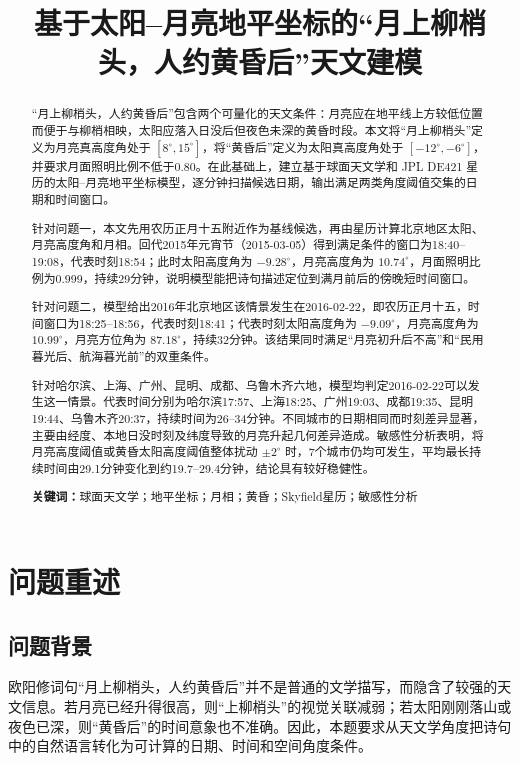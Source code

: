 \documentclass[UTF8,a4paper,12pt]{ctexart}
\title{\heiti 基于太阳--月亮地平坐标的“月上柳梢头，人约黄昏后”天文建模}
\author{}
\date{}
\begin{document}
\maketitle
\thispagestyle{empty}

\begin{abstract}
“月上柳梢头，人约黄昏后”包含两个可量化的天文条件：月亮应在地平线上方较低位置而便于与柳梢相映，太阳应落入日没后但夜色未深的黄昏时段。本文将“月上柳梢头”定义为月亮真高度角处于 $[8^\circ,15^\circ]$，将“黄昏后”定义为太阳真高度角处于 $[-12^\circ,-6^\circ]$，并要求月面照明比例不低于0.80。在此基础上，建立基于球面天文学和 JPL DE421 星历的太阳--月亮地平坐标模型，逐分钟扫描候选日期，输出满足两类角度阈值交集的日期和时间窗口。

针对问题一，本文先用农历正月十五附近作为基线候选，再由星历计算北京地区太阳、月亮高度角和月相。回代2015年元宵节（2015-03-05）得到满足条件的窗口为18:40--19:08，代表时刻18:54；此时太阳高度角为 $-9.28^\circ$，月亮高度角为 $10.74^\circ$，月面照明比例为0.999，持续29分钟，说明模型能把诗句描述定位到满月前后的傍晚短时间窗口。

针对问题二，模型给出2016年北京地区该情景发生在2016-02-22，即农历正月十五，时间窗口为18:25--18:56，代表时刻18:41；代表时刻太阳高度角为 $-9.09^\circ$，月亮高度角为 $10.99^\circ$，月亮方位角为 $87.18^\circ$，持续32分钟。该结果同时满足“月亮初升后不高”和“民用暮光后、航海暮光前”的双重条件。

针对哈尔滨、上海、广州、昆明、成都、乌鲁木齐六地，模型均判定2016-02-22可以发生这一情景。代表时间分别为哈尔滨17:57、上海18:25、广州19:03、成都19:35、昆明19:44、乌鲁木齐20:37，持续时间为26--34分钟。不同城市的日期相同而时刻差异显著，主要由经度、本地日没时刻及纬度导致的月亮升起几何差异造成。敏感性分析表明，将月亮高度阈值或黄昏太阳高度阈值整体扰动 $\pm 2^\circ$ 时，7个城市仍均可发生，平均最长持续时间由29.1分钟变化到约19.7--29.4分钟，结论具有较好稳健性。

\noindent\textbf{关键词：}球面天文学；地平坐标；月相；黄昏；Skyfield星历；敏感性分析
\end{abstract}
\newpage
\tableofcontents
\newpage

\section{问题重述}
\subsection{问题背景}
欧阳修词句“月上柳梢头，人约黄昏后”并不是普通的文学描写，而隐含了较强的天文信息。若月亮已经升得很高，则“上柳梢头”的视觉关联减弱；若太阳刚刚落山或夜色已深，则“黄昏后”的时间意象也不准确。因此，本题要求从天文学角度把诗句中的自然语言转化为可计算的日期、时间和空间角度条件。
\end{document}
